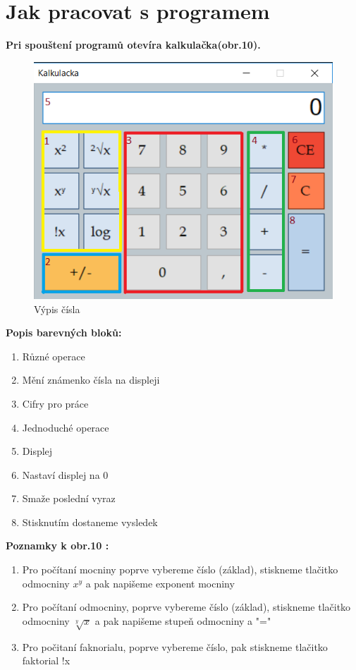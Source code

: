 \documentclass[12pt,a4paper]{article}
\begin{document}
	\section*{\LARGE Jak pracovat s programem}
	
	\textbf{Pri spouštení programů otevíra kalkulačka(obr.10).}
	\begin{figure}[H] 
		\center\includegraphics[width=0.6\linewidth]{pictures/1}
		\caption{Výpis čísla} 
	\end{figure}
	
	\textbf{Popis barevných bloků:}
	\begin{enumerate}
	\item Různé operace 
	\item Mění známenko čísla na displeji
	\item Cifry pro práce
	\item Jednoduché operace
	\item Displej
	\item Nastaví displej na 0
	\item Smaže poslední vyraz
	\item Stisknutím dostaneme vysledek
	\end{enumerate}
	\textbf{Poznamky k obr.10 :}
	\begin{enumerate}
	\item Pro počítaní mocniny poprve vybereme číslo (základ), stiskneme tlačitko odmocniny  $x^{y}$ a pak napišeme exponent mocniny
	\item Pro počítaní odmocniny, poprve vybereme číslo (základ), stiskneme	tlačitko odmocniny $\sqrt[y]{x}$ a pak napišeme stupeň odmocniny a "="
	\item Pro počitaní faknorialu, poprve vybereme číslo, pak stiskneme tlačitko faktorial !x
	\end{enumerate}

	\newpage
	
	
	
\end{document}
